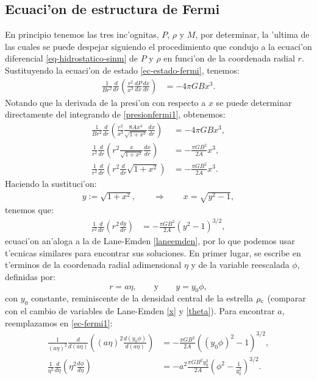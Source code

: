 \subsection{Ecuaci'on de estructura de Fermi}
En principio tenemos las tres inc'ognitas, $P$, $\rho$ y $M$, por determinar, la 'ultima de las cuales se puede despejar siguiendo el procedimiento que condujo a la ecuaci'on diferencial \eqref{eq-hidrostatico-sinm} de $P$ y $\rho$ en funci'on de la coordenada radial $r$. Sustituyendo la ecuaci'on de estado \eqref{ec-estado-fermi}, tenemos:
\begin{align}
\frac{1}{Br^2}\frac{d}{dr}\left(\frac{r^2}{x^3}\frac{dP}{dx}\frac{dx}{dr}\right)&=-4\pi G B x^3.
\end{align}
Notando que la derivada de la presi'on con respecto a $x$ se puede determinar directamente del integrando de \eqref{presionfermi1}, obtenemos:
\begin{align}
\frac{1}{Br^2}\frac{d}{dr}\left(\frac{r^2}{x^3}\frac{8Ax^4}{\sqrt{1+x^2}}\frac{dx}{dr}\right)&=-4\pi G B x^3,\\
\frac{1}{r^2}\frac{d}{dr}\left(r^2\frac{x}{\sqrt{1+x^2}}\frac{dx}{dr}\right)&=-\frac{\pi G B^2}{2A} x^3,\\
\frac{1}{r^2}\frac{d}{dr}\left(r^2\frac{d}{dr}\sqrt{1+x^2}\right)&=-\frac{\pi G B^2}{2A} x^3.
\end{align}
Haciendo la sustituci'on:
\begin{align}\label{sust-fermi}
 y:=\sqrt{1+x^2},\qquad\Rightarrow\qquad x=\sqrt{y^2-1},
\end{align}
tenemos que:
\begin{align}\label{ec-fermi1}
\frac{1}{r^2}\frac{d}{dr}\left(r^2\frac{dy}{dr}\right)&=-\frac{\pi G B^2}{2A} \left(y^2-1\right)^{3/2},
\end{align}
ecuaci'on an'aloga a la de Lane-Emden \eqref{laneemden}, por lo que podemos usar t'ecnicas similares para encontrar sus soluciones. En primer lugar, se escribe en t'erminos de la coordenada radial adimensional $\eta$ y de la variable reescalada $\phi$, definidas por:
\begin{equation}\label{cambio-fermi-adim}
 r=a\eta,\qquad\text{y}\qquad y=y_0\phi,
\end{equation}
con $y_0$ constante, reminiscente de la densidad central de la estrella $\rho_{\rm c}$ (comparar con el cambio de variables de Lane-Emden \eqref{x} y \eqref{theta}). Para encontrar $a$, reemplazamos en \eqref{ec-fermi1}:
\begin{align}
\frac{1}{(a\eta)^2}\frac{d}{d(a\eta)}\left((a\eta)^2\frac{d(y_0\phi)}{d(a\eta)}\right)&=-\frac{\pi G B^2}{2A} \left((y_0\phi)^2-1\right)^{3/2},\\
\frac{1}{\eta^2}\frac{d}{d\eta}\left(\eta^2\frac{d\phi}{d\eta}\right)&=-a^2\frac{\pi G B^2 y_0^2}{2A}\left(\phi^2-\frac{1}{y_0^2}\right)^{3/2}.
\end{align}
